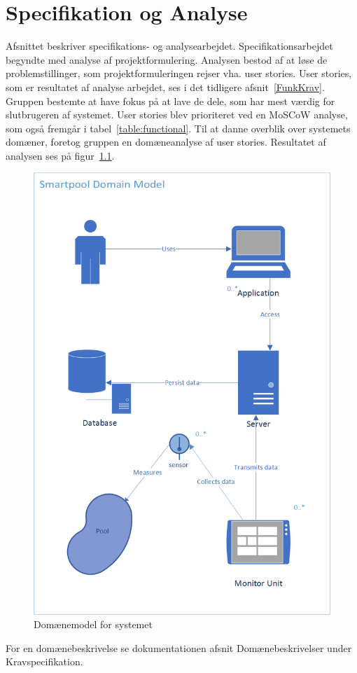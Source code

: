 \chapter{Specifikation og Analyse}
Afsnittet beskriver specifikations- og analysearbejdet. Specifikationsarbejdet begyndte med analyse af projektformulering. Analysen bestod af at løse de problemstillinger, som projektformuleringen rejser vha. user stories. User stories, som er resultatet af analyse arbejdet, ses i det tidligere afsnit~\ref{FunkKrav}. Gruppen bestemte at have fokus på at lave de dele, som har mest værdig for slutbrugeren af systemet. User stories blev prioriteret ved en MoSCoW analyse, som også fremgår i tabel~\ref{table:functional}. Til at danne overblik over systemets domæner, foretog gruppen en domæneanalyse af user stories. Resultatet af analysen ses på figur~\ref{fig:domainmodel}.

\begin{figure}
	\centering
	\includegraphics[width=0.7\linewidth]{figs/DomainModelGraphic}
	\caption{Domænemodel for systemet}
	\label{fig:domainmodel}
\end{figure}

For en domænebeskrivelse se dokumentationen afsnit Domænebeskrivelser under Kravspecifikation.

